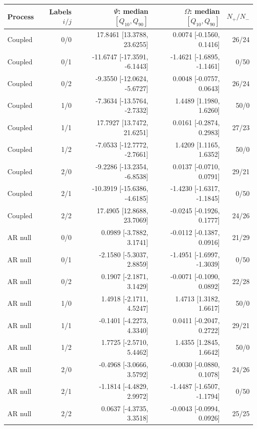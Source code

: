 \begin{table}
\label{tab:temporal-variability}
\begin{tabular}{lrrrr}
\toprule
Process & Labels $i/j$ & $\Psi$: median $[Q_{10},Q_{90}]$ & $\Omega$: median $[Q_{10},Q_{90}]$ & $N_+/N_-$ \\
\midrule
Coupled & 0/0 & 17.8461 [13.3788, 23.6255] & 0.0074 [-0.1560, 0.1416] & 26/24 \\
Coupled & 0/1 & -11.6747 [-17.3591, -6.1443] & -1.4621 [-1.6895, -1.1461] & 0/50 \\
Coupled & 0/2 & -9.3550 [-12.0624, -5.6727] & 0.0048 [-0.0757, 0.0643] & 26/24 \\
Coupled & 1/0 & -7.3634 [-13.5764, -2.7332] & 1.4489 [1.1980, 1.6260] & 50/0 \\
Coupled & 1/1 & 17.7927 [13.7472, 21.6251] & 0.0161 [-0.2874, 0.2983] & 27/23 \\
Coupled & 1/2 & -7.0533 [-12.7772, -2.7661] & 1.4209 [1.1165, 1.6352] & 50/0 \\
Coupled & 2/0 & -9.2286 [-13.2354, -6.8538] & 0.0137 [-0.0710, 0.0791] & 29/21 \\
Coupled & 2/1 & -10.3919 [-15.6386, -4.6185] & -1.4230 [-1.6317, -1.1845] & 0/50 \\
Coupled & 2/2 & 17.4905 [12.8688, 23.7069] & -0.0245 [-0.1926, 0.1777] & 24/26 \\
AR null & 0/0 & 0.0989 [-3.7882, 3.1741] & -0.0112 [-0.1387, 0.0916] & 21/29 \\
AR null & 0/1 & -2.1580 [-5.3037, 2.8859] & -1.4951 [-1.6997, -1.3039] & 0/50 \\
AR null & 0/2 & 0.1907 [-2.1871, 3.1429] & -0.0071 [-0.1090, 0.0892] & 22/28 \\
AR null & 1/0 & 1.4918 [-2.1711, 4.5247] & 1.4713 [1.3182, 1.6617] & 50/0 \\
AR null & 1/1 & -0.1401 [-4.2273, 4.3340] & 0.0411 [-0.2047, 0.2722] & 29/21 \\
AR null & 1/2 & 1.7725 [-2.5710, 5.4462] & 1.4355 [1.2845, 1.6642] & 50/0 \\
AR null & 2/0 & -0.4968 [-3.0666, 3.5792] & -0.0030 [-0.0880, 0.1078] & 24/26 \\
AR null & 2/1 & -1.1814 [-4.4829, 2.9972] & -1.4487 [-1.6507, -1.1794] & 0/50 \\
AR null & 2/2 & 0.0637 [-4.3735, 3.3518] & -0.0043 [-0.0994, 0.0926] & 25/25 \\
\bottomrule
\end{tabular}
\end{table}

